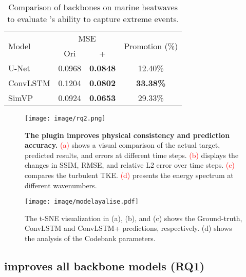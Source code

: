 \begin{table}[htbp]
  \centering
  \small
  \begin{sc}
    \caption{Comparison of backbones on marine heatwaves to evaluate \method{}'s ability to capture extreme events.}
    \label{tab:heatwaves}
      \begin{tabular}{lccc}
        \toprule
        \multirow{2}{*}{Model} & \multicolumn{2}{c}{MSE} & \multirow{2}{*}{Promotion (\%)} \\ 
        \cmidrule(lr){2-3}
        & Ori & +\method{} &  \\ 
        \midrule
        U-Net & 0.0968 & \textbf{0.0848} & 12.40\% \\
        ConvLSTM & 0.1204 & \textbf{0.0802} & \textbf{33.38\%} \\
        SimVP & 0.0924 & \textbf{0.0653} & 29.33\% \\
        \bottomrule
      \end{tabular}%
  \end{sc}
\end{table}

\begin{figure*}[t]
    \centering
    \texttt{[image: image/rq2.png]}
    \caption{\textbf{The \method{} plugin improves physical consistency and prediction accuracy.} \textcolor{red}{(a)} shows a visual comparison of the actual target, predicted results, and errors at different time steps. \textcolor{red}{(b)} displays the changes in SSIM, RMSE, and relative L2 error over time steps. \textcolor{red}{(c)} compares the turbulent TKE. \textcolor{red}{(d)} presents the energy spectrum at different wavenumbers.}
    \label{fig:phy}
\end{figure*}
\begin{figure*}[h]
    \centering
    \texttt{[image: image/modelayalise.pdf]}
    \caption{The t-SNE visualization in (a), (b), and (c) shows the Ground-truth, ConvLSTM and ConvLSTM+\method{} predictions, respectively. (d) shows the analysis of the Codebank parameters.}
    \label{fig:tsne} 
\end{figure*}




\subsection{\method{} improves all backbone models (RQ1)}

